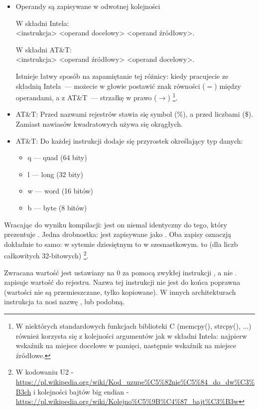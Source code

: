 \begin{itemize}

\item
Operandy są zapisywane w odwotnej kolejności

W składni Intela: \\
<instrukcja> <operand docelowy> <operand źródłowy>.

W składni AT\&T: \\
<instrukcja> <operand źródłowy> <operand docelowy>.

Istnieje łatwy sposób na zapamiętanie tej różnicy:
kiedy pracujecie ze składnią Intela~--- możecie w głowie postawić znak równości ($=$) między operandami,
a z AT\&T~--- strzałkę w prawo ($\rightarrow$)
\footnote{W niektórych standardowych funkcjach biblioteki C (memcpy(), strcpy(), ...) również korzysta się z kolejności argumentów jak w składni Intela: najpierw wskaźnik na miejsce docelowe w pamięci,
następnie wskaźnik na miejsce źródłowe.}.

\item
AT\&T: Przed nazwami rejestrów stawia się symbol (\%), a przed liczbami (\$).
Zamiast nawiasów kwadratowych używa się okrągłych.

\item
AT\&T: Do każdej instrukcji dodaje się przyrostek określający typ danych:

\begin{itemize}
\item q --- quad (64 bity)
\item l --- long (32 bity)
\item w --- word (16 bitów)
\item b --- byte (8 bitów)
\end{itemize}


\end{itemize}

Wracając do wyniku kompilacji: jest on niemal identyczny do tego, który prezentuje \IDA.
Jedna drobnostka:  jest zapisywane jako .
Oba zapisy oznaczją dokładnie to samo:  w sytemie dziesiętnym to  w szesnastkowym.
 to  (dla liczb całkowitych 32-bitowych) \footnote{W kodowaniu U2 - \url{https://pl.wikipedia.org/wiki/Kod_uzupe%C5%82nie%C5%84_do_dw%C3%B3ch} i kolejności bajtów big endian - \url{https://pl.wikipedia.org/wiki/Kolejno%C5%9B%C4%87_bajt%C3%B3w}}.

Zwracana wartość jest ustawiany na 0 za pomocą zwykłej instrukcji \MOV, a nie \XOR.
\MOV zapisuje wartość do rejestru.
Nazwa tej instrukcji nie jest do końca poprawna (wartości nie są przemieszczane, tylko kopiowane). W innych architekturach instrukcja ta nosi nazwę ,  lub podobną.

